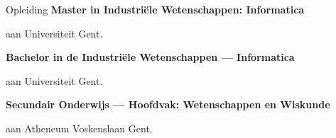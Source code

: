 \begin{rubric}{Opleiding}
        \textbf{Master in Industriële Wetenschappen: Informatica}\par aan Universiteit Gent.
    
        \textbf{Bachelor in de Industriële Wetenschappen — Informatica}\par aan Universiteit Gent.\par

        \textbf{Secundair Onderwijs — Hoofdvak: Wetenschappen en Wiskunde}\par aan Atheneum Voskenslaan Gent. \par
\end{rubric}
